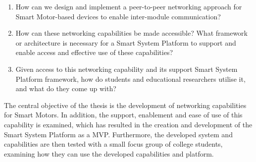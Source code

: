 \begin{enumerate}
    \item How can we design and implement a peer-to-peer networking approach for Smart Motor-based devices to enable inter-module communication?
    \item How can these networking capabilities be made accessible? What framework or architecture is necessary for a Smart System Platform to support and enable access and effective use of these capabilities?
    \item Given access to this networking capability and its support Smart System Platform framework, how do students and educational researchers utilise it, and what do they come up with?
    
\end{enumerate}

The central objective of the thesis is the development of networking capabilities for Smart Motors. In addition, the support, enablement and ease of use of this capability is examined, which has resulted in the creation and development of the Smart System Platform as a MVP. Furthermore, the developed system and capabilities are then tested with a small focus group of college students, examining how they can use the developed capabilities and platform.



